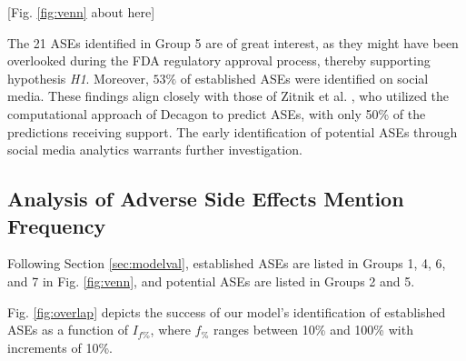 \documentclass[referee,bst/sn-basic]{sn-jnl}%
\theoremstyle{thmstyletwo}%
\theoremstyle{thmstylethree}%
\begin{document}
\begin{center}
    [Fig. \ref{fig:venn} about here]
\end{center}

The 21 ASEs identified in Group 5 are of great interest, as they might have been overlooked during the FDA regulatory approval process, thereby supporting hypothesis \textit{H1}.
Moreover, $53\%$ of established ASEs were identified on social media.
These findings align closely with those of Zitnik et al. \cite{zitnik2018modeling}, who utilized the computational approach of Decagon to predict ASEs, with only 50\% of the predictions receiving support.
The early identification of potential ASEs through social media analytics warrants further investigation.

\begin{comment}
\begin{figure}[H]
    \centering
    \texttt{[image: images/venn5.pdf]}
    \caption{Venn diagram offering a visual representation of and distinction among ASEs.
    }
    \label{fig:venn}
\end{figure}
\end{comment}
\subsection{Analysis of Adverse Side Effects Mention Frequency}
\label{sec:model_eval}
Following Section \ref{sec:modelval}, established ASEs are listed in Groups 1, 4, 6, and 7 in Fig. \ref{fig:venn}, and potential ASEs are listed in Groups 2 and 5.

Fig. \ref{fig:overlap} depicts the success of our model's identification of established ASEs as a function of $I_{f\%}$, where $f_\%$ ranges between 10\% and 100\% with increments of 10\%.
\end{document}
